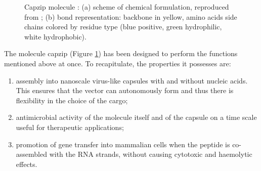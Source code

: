 \begin{figure}
\begin{center}
 \hspace{0.5cm}
\caption[Cazip molecule]{Capzip molecule \citep{Castelletto2016}: (a) scheme of chemical formulation, reproduced from \citet{Castelletto2016}; (b) bond representation: backbone in yellow, amino acids side chains colored by residue type (blue positive, green hydrophilic, white hydrophobic).} \label{fig:capzip}
\end{center}
\end{figure}

The molecule capzip \citep{Castelletto2016} (Figure \ref{fig:capzip}) has been designed to perform the functions mentioned above at once. To recapitulate, the properties it possesses are:
\begin{enumerate}
\item assembly into nanoscale virus-like capsules with and without nucleic acids. This ensures that the vector can autonomously form and thus there is flexibility in the choice of the cargo;
\item antimicrobial activity of the molecule itself and of the capsule on a time scale useful for therapeutic applications;
\item promotion of gene transfer into mammalian cells when the peptide is co-assembled with the RNA strands, without causing cytotoxic and haemolytic effects.
\end{enumerate}

